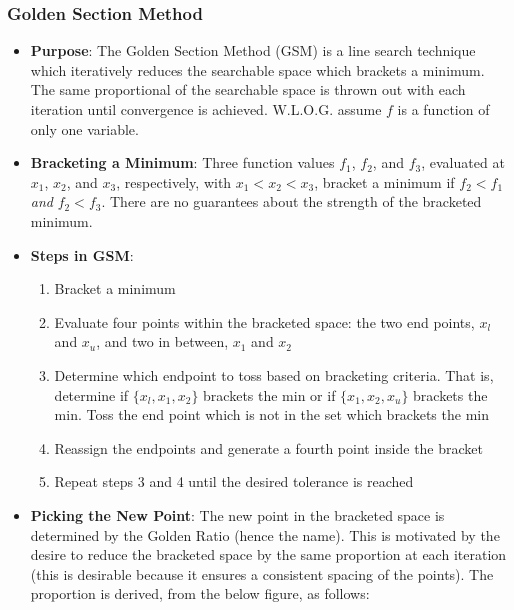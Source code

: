 \documentclass[12pt]{article}
\newcommand{\Item}[1]{\item \textbf{#1}:}
\begin{document}
\subsubsection{Golden Section Method}
\begin{itemize}
\Item{Purpose} The Golden Section Method (GSM) is a line search technique which iteratively reduces the searchable space which brackets a minimum. The same proportional of the searchable space is thrown out with each iteration until convergence is achieved. W.L.O.G. assume $f$ is a function of only one variable.
\Item{Bracketing a Minimum} Three function values $f_1$, $f_2$, and $f_3$, evaluated at $x_1$, $x_2$, and $x_3$, respectively, with $x_1<x_2<x_3$, bracket a minimum if $f_2<f_1$ \emph{and} $f_2<f_3$. There are no guarantees about the strength of the bracketed minimum.
\Item{Steps in GSM}
	\begin{enumerate}
	\item Bracket a minimum
	\item Evaluate four points within the bracketed space: the two end points, $x_l$ and $x_u$, and two in between, $x_1$ and $x_2$
	\item Determine which endpoint to toss based on bracketing criteria. That is, determine if $\{x_l,x_1,x_2\}$ brackets the min or if $\{x_1,x_2,x_u\}$ brackets the min. Toss the end point which is not in the set which brackets the min
	\item Reassign the endpoints and generate a fourth point inside the bracket
	\item Repeat steps 3 and 4 until the desired tolerance is reached
	\end{enumerate}
\Item{Picking the New Point} The new point in the bracketed space is determined by the Golden Ratio (hence the name). This is motivated by the desire to reduce the bracketed space by the same proportion at each iteration (this is desirable because it ensures a consistent spacing of the points). The proportion is derived, from the below figure, as follows:
\begin{figure}[h]\centering

\end{figure}
\end{itemize}
\end{document}
